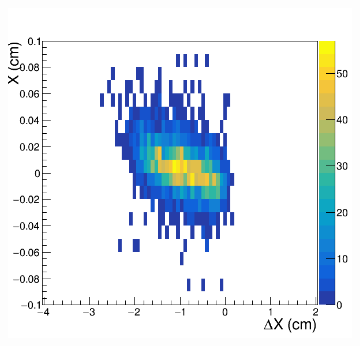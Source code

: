 \begin{figure}[h!]
\centering
 \begin{subfigure}[l]{.45\textwidth}
   \centering
   \includegraphics[width=\linewidth]{thesis_figures/alignment/Run_3211_T/G1X_after_millepede_U.png}


\end{subfigure}
\end{figure}
